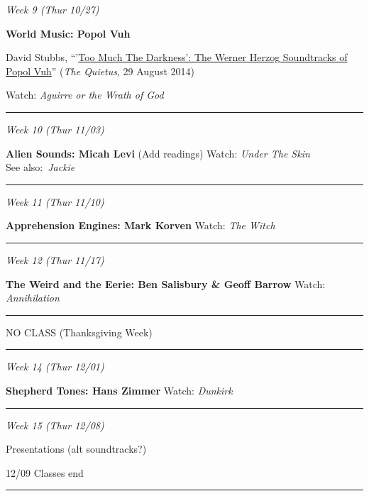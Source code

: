 \documentclass[]{tufte-handout}
\begin{document}
\emph{Week 9 (Thur 10/27)}

\textbf{World Music: Popol Vuh}

David Stubbs,
``'\href{https://thequietus.com/articles/16110-herzog-popol-vuh-overview}{Too
Much The Darkness': The Werner Herzog Soundtracks of Popol Vuh}''
(\emph{The Quietus}, 29 August 2014)

Watch: \emph{Aguirre or the Wrath of God}

\begin{center}\rule{0.5\linewidth}{0.5pt}\end{center}

\emph{Week 10 (Thur 11/03)}

\textbf{Alien Sounds: Micah Levi} (Add readings) Watch: \emph{Under The
Skin}\\
See also:~\emph{Jackie}

\begin{center}\rule{0.5\linewidth}{0.5pt}\end{center}

\emph{Week 11 (Thur 11/10)}

\textbf{Apprehension Engines: Mark Korven} Watch: \emph{The Witch}

\begin{center}\rule{0.5\linewidth}{0.5pt}\end{center}

\emph{Week 12 (Thur 11/17)}

\textbf{The Weird and the Eerie: Ben Salisbury \& Geoff Barrow} Watch:
\emph{Annihilation}

\begin{center}\rule{0.5\linewidth}{0.5pt}\end{center}

NO CLASS (Thanksgiving Week)

\begin{center}\rule{0.5\linewidth}{0.5pt}\end{center}

\emph{Week 14 (Thur 12/01)}

\textbf{Shepherd Tones: Hans Zimmer} Watch: \emph{Dunkirk}

\begin{center}\rule{0.5\linewidth}{0.5pt}\end{center}

\emph{Week 15 (Thur 12/08)}

Presentations (alt soundtracks?)

12/09 Classes end

\begin{center}\rule{0.5\linewidth}{0.5pt}\end{center}
\end{document}
